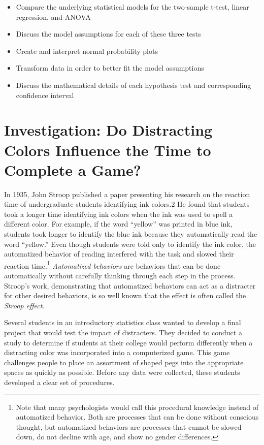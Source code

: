 \documentclass[
]{report}
\providecommand{\tightlist}{%
  \setlength{\itemsep}{0pt}\setlength{\parskip}{0pt}}
\begin{document}
\begin{itemize}
\tightlist
\item
  Compare the underlying statistical models for the two-sample t-test, linear regression, and
  ANOVA
\item
  Discuss the model assumptions for each of these three tests
\item
  Create and interpret normal probability plots
\item
  Transform data in order to better fit the model assumptions
\item
  Discuss the mathematical details of each hypothesis test and corresponding confidence interval
\end{itemize}

\newpage

\hypertarget{investigation-do-distracting-colors-influence-the-time-to-complete-a-game}{%
\section{Investigation: Do Distracting Colors Influence the Time to Complete a Game?}\label{investigation-do-distracting-colors-influence-the-time-to-complete-a-game}}

In 1935, John Stroop published a paper presenting his research on the reaction time of undergraduate students identifying ink colors.2 He found that students took a longer time identifying ink colors when the ink was used to spell a different color. For example, if the word ``\color{blue}yellow\color{black}'' was printed in blue ink, students took longer to identify the blue ink because they automatically read the word ``yellow.'' Even though students were told only to identify the ink color, the automatized behavior of reading interfered with the task and slowed their reaction time.\footnote{Note that many psychologists would call this procedural knowledge instead of automatized behavior. Both are processes that can be done without conscious thought, but automatized behaviors are processes that cannot be slowed down, do not
  decline with age, and show no gender differences.} \emph{Automatized behaviors} are behaviors that can be done automatically without carefully thinking through each step in the process. Stroop's work, demonstrating that automatized behaviors can act as a distracter for other desired behaviors, is so well known that the effect is often called the \emph{Stroop effect}.

Several students in an introductory statistics class wanted to develop a final project that would test the impact of distracters. They decided to conduct a study to determine if students at their college would perform differently when a distracting color was incorporated into a computerized game. This game challenges people to place an assortment of shaped pegs into the appropriate spaces as quickly as possible. Before any data were collected, these students developed a clear set of procedures.
\end{document}

